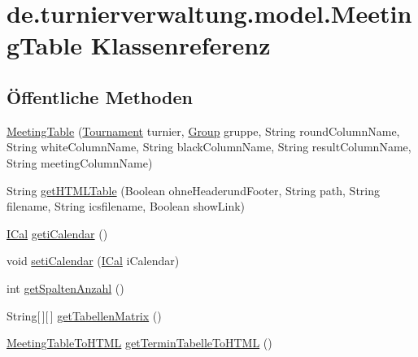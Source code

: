 \hypertarget{classde_1_1turnierverwaltung_1_1model_1_1_meeting_table}{}\section{de.\+turnierverwaltung.\+model.\+Meeting\+Table Klassenreferenz}
\label{classde_1_1turnierverwaltung_1_1model_1_1_meeting_table}
\subsection*{Öffentliche Methoden}
\begin{DoxyCompactItemize}
\item 
\hyperlink{classde_1_1turnierverwaltung_1_1model_1_1_meeting_table_ac267f3d07439b29d4b99b422b80462b5}{Meeting\+Table} (\hyperlink{classde_1_1turnierverwaltung_1_1model_1_1_tournament}{Tournament} turnier, \hyperlink{classde_1_1turnierverwaltung_1_1model_1_1_group}{Group} gruppe, String round\+Column\+Name, String white\+Column\+Name, String black\+Column\+Name, String result\+Column\+Name, String meeting\+Column\+Name)
\item 
String \hyperlink{classde_1_1turnierverwaltung_1_1model_1_1_meeting_table_a6881dc226fbcc2c8cd6b3ccd8880eb32}{get\+H\+T\+M\+L\+Table} (Boolean ohne\+Headerund\+Footer, String path, String filename, String icsfilename, Boolean show\+Link)
\item 
\hyperlink{classde_1_1turnierverwaltung_1_1model_1_1_i_cal}{I\+Cal} \hyperlink{classde_1_1turnierverwaltung_1_1model_1_1_meeting_table_abf17cf7630da82699c4bd57b0cc05941}{geti\+Calendar} ()
\item 
void \hyperlink{classde_1_1turnierverwaltung_1_1model_1_1_meeting_table_aa8f97d5b552457f33226de359eecdeb8}{seti\+Calendar} (\hyperlink{classde_1_1turnierverwaltung_1_1model_1_1_i_cal}{I\+Cal} i\+Calendar)
\item 
int \hyperlink{classde_1_1turnierverwaltung_1_1model_1_1_meeting_table_aab7b6598a2faded9491b0ab9e3f5e4d4}{get\+Spalten\+Anzahl} ()
\item 
String\mbox{[}$\,$\mbox{]}\mbox{[}$\,$\mbox{]} \hyperlink{classde_1_1turnierverwaltung_1_1model_1_1_meeting_table_a90b4a79eb71e2984da53666a1843bf4c}{get\+Tabellen\+Matrix} ()
\item 
\hyperlink{classde_1_1turnierverwaltung_1_1model_1_1_meeting_table_to_h_t_m_l}{Meeting\+Table\+To\+H\+T\+ML} \hyperlink{classde_1_1turnierverwaltung_1_1model_1_1_meeting_table_a3fa1430fb35d7a7fb42e060f663e300f}{get\+Termin\+Tabelle\+To\+H\+T\+ML} ()

\end{DoxyCompactItemize}

